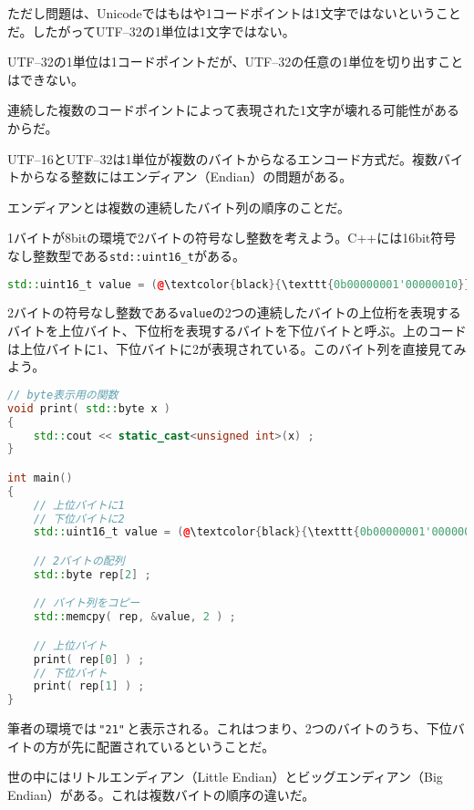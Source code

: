 ただし問題は、Unicodeではもはや1コードポイントは1文字ではないということだ。したがってUTF--32の1単位は1文字ではない。

UTF--32の1単位は1コードポイントだが、UTF--32の任意の1単位を切り出すことはできない。

連続した複数のコードポイントによって表現された1文字が壊れる可能性があるからだ。


UTF--16とUTF--32は1単位が複数のバイトからなるエンコード方式だ。複数バイトからなる整数にはエンディアン（Endian）の問題がある。

エンディアンとは複数の連続したバイト列の順序のことだ。

1バイトが8bitの環境で2バイトの符号なし整数を考えよう。C++には16bit符号なし整数型である\texttt{std::uint16\_t}がある。

\begin{lstlisting}[language={C++}]
std::uint16_t value = (@\textcolor{black}{\texttt{0b00000001'00000010}}@) ;
\end{lstlisting}

2バイトの符号なし整数である\texttt{value}の2つの連続したバイトの上位桁を表現するバイトを上位バイト、下位桁を表現するバイトを下位バイトと呼ぶ。上のコードは上位バイトに1、下位バイトに2が表現されている。このバイト列を直接見てみよう。

\begin{lstlisting}[language={C++}]
// byte表示用の関数
void print( std::byte x )
{
    std::cout << static_cast<unsigned int>(x) ;
} 

int main()
{
    // 上位バイトに1
    // 下位バイトに2
    std::uint16_t value = (@\textcolor{black}{\texttt{0b00000001'00000010}}@) ;

    // 2バイトの配列
    std::byte rep[2] ;

    // バイト列をコピー
    std::memcpy( rep, &value, 2 ) ;

    // 上位バイト
    print( rep[0] ) ;
    // 下位バイト
    print( rep[1] ) ;
}
\end{lstlisting}

筆者の環境では\,\texttt{"21"}\,と表示される。これはつまり、2つのバイトのうち、下位バイトの方が先に配置されているということだ。

世の中にはリトルエンディアン（Little Endian）とビッグエンディアン（Big Endian）がある。これは複数バイトの順序の違いだ。

